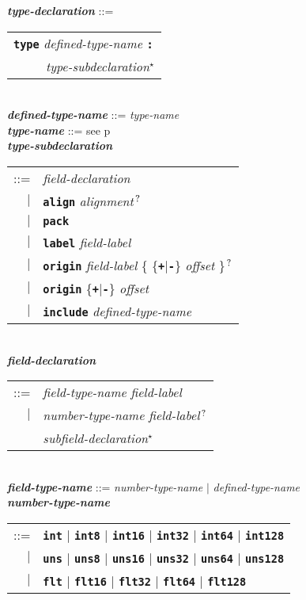 \documentclass[12pt]{article}
\newcommand{\TT}[1]{{\tt \bfseries #1}}
\newcommand{\STAR}{{\Large $^\star$}}
\newcommand{\QMARK}{{$^{\,\mbox{\footnotesize ?}}$}}
\newcommand{\ttkey}[1]{{\tt \bfseries #1}}
\newcommand{\emkey}[1]{{\em \bfseries #1}}
\newcommand{\pagref}[1]{p\pageref{#1}}
\newenvironment{indpar}[1][0.3in]%
	{\begin{list}{}%
		     {\setlength{\itemsep}{0in}%
		      \setlength{\topsep}{0in}%
		      \setlength{\parsep}{1ex}%
		      \setlength{\labelwidth}{#1}%
		      \setlength{\leftmargin}{#1}%
		      \addtolength{\leftmargin}{\labelsep}}%
	 \item}%
	{\end{list}}
\begin{document}
\begin{indpar}
\emkey{type-declaration}\label{TYPE-DECLARATION}
    ::= \begin{tabular}[t]{l}
        \ttkey{type} {\em defined-type-name} \TT{:} \\
	\TT{~~~~~}{\em type-subdeclaration}\STAR{}
	\end{tabular} \\
\emkey{defined-type-name} ::= {\em type-name} \\
\emkey{type-name} ::= see \pagref{TYPE-NAME}
\\[2ex]
\emkey{type-subdeclaration}
    \begin{tabular}[t]{@{}rl}
    ::= &  {\em field-declaration} \\
    $|$ &  \ttkey{align} {\em alignment}\QMARK{} \\
    $|$ &  \ttkey{pack} \\
    $|$ &  \ttkey{label} {\em field-label} \\
    $|$ &  \ttkey{origin} {\em field-label}
           \{ \{\TT{+}$|$\TT{-}\} {\em offset} \}\QMARK{} \\
    $|$ &  \ttkey{origin} \{\TT{+}$|$\TT{-}\} {\em offset} \\
    $|$ &  \ttkey{include} {\em defined-type-name} \\
    \end{tabular}
\\[2ex]
\emkey{field-declaration}
    \begin{tabular}[t]{@{}rl}
    ::= &  {\em field-type-name} {\em field-label} \\
    $|$ &  {\em number-type-name} {\em field-label}\QMARK{} \\
	&  {\em subfield-declaration}\STAR{}
    \end{tabular}
\\[2ex]
\emkey{field-type-name} ::= {\em number-type-name}
                        $|$ {\em defined-type-name} \\
\emkey{number-type-name}
    \begin{tabular}[t]{@{}rl}
    ::= &  \ttkey{int} $|$ \ttkey{int8} $|$ \ttkey{int16} $|$ \ttkey{int32}
                       $|$ \ttkey{int64} $|$ \ttkey{int128} \\
    $|$ &  \ttkey{uns} $|$ \ttkey{uns8} $|$ \ttkey{uns16} $|$ \ttkey{uns32}
                       $|$ \ttkey{uns64} $|$ \ttkey{uns128} \\
    $|$ &  \ttkey{flt} $|$ \ttkey{flt16} $|$ \ttkey{flt32} $|$ \ttkey{flt64}
                         $|$ \ttkey{flt128} \\

\end{tabular}
\end{indpar}
\end{document}
